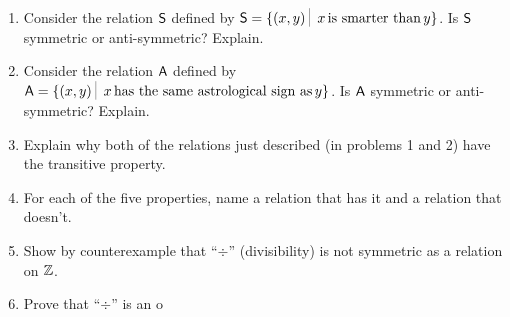 \begin{enumerate}
\item Consider the relation $\mbox{\textsf S}$ defined by 
$ \relS = \{ (x,y) \suchthat \; x \, \mbox{is smarter than} \, y \}$.
Is $\mbox{\textsf S}$ symmetric or anti-symmetric?  Explain.

\wbvfill

\item Consider the relation $\mbox{\textsf A}$ defined by 
$ \relA = \{ (x,y) \suchthat \; x \, \mbox{has the same astrological sign as} \, y \}$.
Is $\mbox{\textsf A}$ symmetric or anti-symmetric?  Explain.

\wbvfill

\item Explain why both of the relations just described (in problems 1 and 2)
have the transitive property.

\wbvfill

\item For each of the five properties, name a relation that has it
and a relation that doesn't.

\wbvfill

\rule{0pt}{0pt}

\wbvfill

\workbookpagebreak

\item Show by counterexample that ``$\div$'' (divisibility) is not symmetric as a relation on ${\mathbb Z}$.

 \wbvfill
 
 \item Prove that ``$\div$'' is an o
 
\end{enumerate} 

